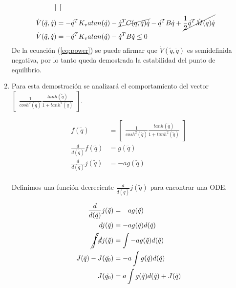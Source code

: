 \documentclass[12pt]{article}
\begin{document}
\begin{enumerate}
\begin{equation}
\begin{split}
{\begin{bmatrix}
            \end{bmatrix}}\\
            \dot{V}(\tilde{q},\dot{q})&=-\dot{q}^TK_vatan(\dot{q})-\cancel{\dot{q}^TC(q,\dot{q})\dot{q}}-\dot{q}^TB\dot{q}+\cancel{\frac{1}{2}\dot{q}^T\dot{M}(q)\dot{q}}\\
            \dot{V}(\tilde{q},\dot{q})&=-\dot{q}^TK_vatan(\dot{q})-\dot{q}^TB\dot{q}\leq 0\\
        \end{split}
        \label{eq:power}
    \end{equation}
    De la ecuación (\ref{eq:power}) se puede afirmar que $\dot{V}(\tilde{q},\dot{q})$ es semidefinida negativa, por lo tanto queda demostrada la estabilidad del punto de equilibrio.
    \item Para esta demostración se analizará el comportamiento del vector $\begin{bmatrix}
        \frac{1}{cosh^2(\tilde{q})}\frac{tanh(\tilde{q})}{1+tanh^2(\tilde{q})}
    \end{bmatrix}$.

    \begin{equation}
        \begin{split}
            f(\tilde{q})&=\begin{bmatrix}
                \frac{1}{cosh^2(\tilde{q})}\frac{tanh(\tilde{q})}{1+tanh^2(\tilde{q})}
            \end{bmatrix}\\
            \frac{d}{d(\tilde{q})}f(\tilde{q})&=g(\tilde{q})\\
            \frac{d}{d(\tilde{q})}j(\tilde{q})&=-ag(\tilde{q})\\
        \end{split}
        \label{eq:upper_limit}
    \end{equation}

    Definimos una función decreciente $\frac{d}{d(\tilde{q})}j(\tilde{q})$ para encontrar una ODE.

    \begin{equation}
        \begin{split}
            \frac{d}{d(\tilde{q})}j(\tilde{q})&=-ag(\tilde{q})\\
            dj(\tilde{q})&=-ag(\tilde{q})d(\tilde{q})\\
            \cancel{\int} \cancel{d}j(\tilde{q})&=\int-ag(\tilde{q})d(\tilde{q})\\
            J(\tilde{q})-J(\tilde{q_0})&=-a\int g(\tilde{q})d(\tilde{q})\\
            J(\tilde{q_0})&=a\int g(\tilde{q})d(\tilde{q})+J(\tilde{q})\\
        \end{split}
        \label{eq:lower_limit}
    \end{equation}


\end{enumerate}
\end{document}
